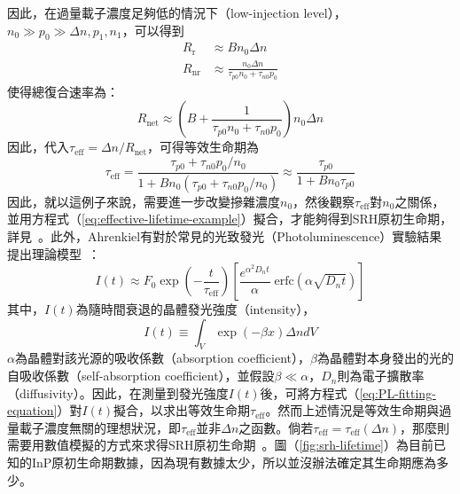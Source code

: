 因此，在過量載子濃度足夠低的情況下（low-injection level），$n_0\gg p_0\gg\Delta n,p_1,n_1$，可以得到
\begin{equation}
\begin{aligned}
R_\text{r}&\approx Bn_0\Delta n\\[5pt]
R_\text{nr}&\approx \frac{n_0\Delta n}{\tau_{p0}n_0+\tau_{n0}p_0}
\end{aligned}
\end{equation}
使得總復合速率為：
\begin{equation}
R_\text{net}\approx\left(B+\frac{1}{\tau_{p0}n_0+\tau_{n0}p_0}\right)n_0\Delta n
\end{equation}
因此，代入$\tau_\text{eff}=\Delta n/R_\text{net}$，可得等效生命期為
\begin{equation}
\label{eq:effective-lifetime-example}
\tau_\text{eff}=\frac{\tau_{p0}+\tau_{n0}p_0/n_0}{1+Bn_0\left(\tau_{p0}+\tau_{n0}p_0/n_0\right)}\approx \frac{\tau_{p0}}{1+Bn_0\tau_{p0}}
\end{equation}
因此，就以這例子來說，需要進一步改變摻雜濃度$n_0$，然後觀察$\tau_\text{eff}$對$n_0$之關係，並用方程式（\ref{eq:effective-lifetime-example}）擬合，才能夠得到SRH原初生命期，詳見~\cite{yater1994minority}。此外，Ahrenkiel有對於常見的光致發光（Photoluminescence）實驗結果提出理論模型~\cite{ahrenkiel1988photoluminescence}：
\begin{equation}
\label{eq:PL-fitting-equation}
I(t)\approx F_0\exp\left(-\frac{t}{\tau_\text{eff}}\right)\left[\frac{e^{\alpha^2D_nt}}{\alpha}\;\text{erfc}\left(\alpha\sqrt{D_nt}\right)\right]
\end{equation}
其中，$I(t)$為隨時間衰退的晶體發光強度（intensity），
\begin{equation}
I(t)\equiv\int_V\exp\left(-\beta x\right)\Delta ndV
\end{equation}
$\alpha$為晶體對該光源的吸收係數（absorption coefficient），$\beta$為晶體對本身發出的光的自吸收係數（self-absorption coefficient），並假設$\beta\ll\alpha$，$D_n$則為電子擴散率（diffusivity）。因此，在測量到發光強度$I(t)$後，可將方程式（\ref{eq:PL-fitting-equation}）對$I(t)$擬合，以求出等效生命期$\tau_\text{eff}$。然而上述情況是等效生命期與過量載子濃度無關的理想狀況，即$\tau_\text{eff}$並非$\Delta n$之函數。倘若$\tau_\text{eff}=\tau_\text{eff}(\Delta n)$，那麼則需要用數值模擬的方式來求得SRH原初生命期~\cite{liu1999excess}。圖（\ref{fig:srh-lifetime}）為目前已知的InP原初生命期數據，因為現有數據太少，所以並沒辦法確定其生命期應為多少。

